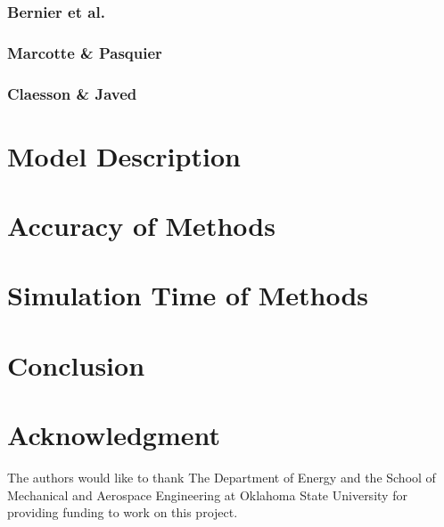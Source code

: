 \documentclass{article}
\begin{document}
\subsubsection{Bernier et al.}

\subsubsection{Marcotte \& Pasquier}

\subsubsection{Claesson \& Javed}


\section{Model Description}


\section{Accuracy of Methods}


\section{Simulation Time of Methods}


\section{Conclusion}


\section*{Acknowledgment}


The authors would like to thank The Department of Energy and the School of Mechanical and Aerospace Engineering at Oklahoma State University for providing funding to work on this project.



\end{document}
